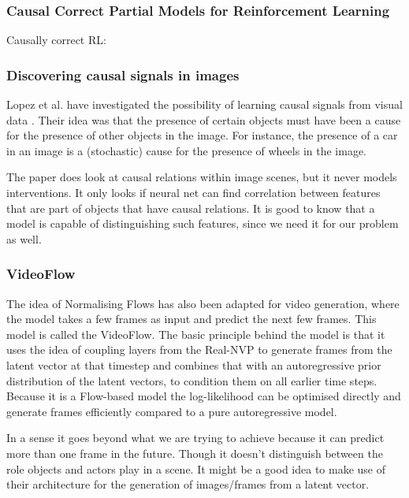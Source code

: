 \documentclass{article}
\begin{document}
\subsubsection*{Causal Correct Partial Models for Reinforcement Learning}
Causally correct RL: \cite{rezende2020causally}

\subsubsection*{Discovering causal signals in images}
Lopez et al. have investigated the possibility of learning causal signals from visual data \cite{lopez2017discovering}. Their idea was that the presence of certain objects must have been a cause for the presence of other objects in the image. For instance, the presence of a car in an image is a (stochastic) cause for the presence of wheels in the image. 

The paper does look at causal relations within image scenes, but it never models interventions. It only looks if neural net can find correlation between features that are part of objects that have causal relations. It is good to know that a model is capable of distinguishing such features, since we need it for our problem as well.

\subsubsection*{VideoFlow}
The idea of Normalising Flows has also been adapted for video generation, where the model takes a few frames as input and predict the next few frames. This model is called the VideoFlow\cite{kumar2019videoflow}. The basic principle behind the model is that it uses the idea of coupling layers from the Real-NVP to generate frames from the latent vector at that timestep and combines that with an autoregressive prior distribution of the latent vectors, to condition them on all earlier time steps. Because it is a Flow-based model the log-likelihood can be optimised directly and generate frames efficiently compared to a pure autoregressive model.

In a sense it goes beyond what we are trying to achieve because it can predict more than one frame in the future. Though it doesn't distinguish between the role objects and actors play in a scene. It might be a good idea to make use of their architecture for the generation of images/frames from a latent vector.





\end{document}
